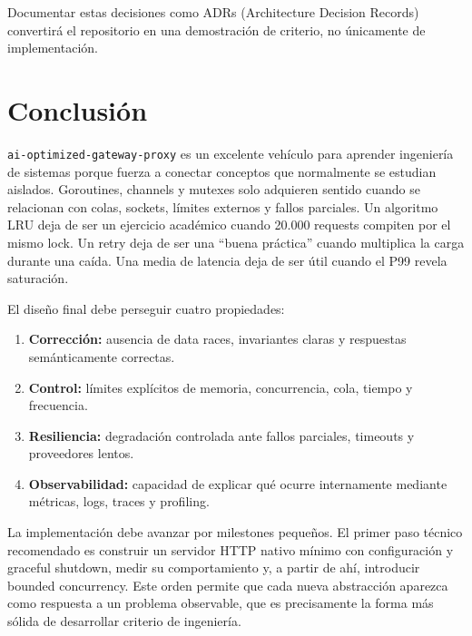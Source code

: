 \documentclass[11pt,a4paper]{article}
\newcommand{\project}{\texttt{ai-optimized-gateway-proxy}}
\begin{document}
Documentar estas decisiones como ADRs (Architecture Decision Records) convertirá el repositorio en una demostración de criterio, no únicamente de implementación.

\section{Conclusión}

\project{} es un excelente vehículo para aprender ingeniería de sistemas porque fuerza a conectar conceptos que normalmente se estudian aislados. Goroutines, channels y mutexes solo adquieren sentido cuando se relacionan con colas, sockets, límites externos y fallos parciales. Un algoritmo LRU deja de ser un ejercicio académico cuando 20.000 requests compiten por el mismo lock. Un retry deja de ser una ``buena práctica'' cuando multiplica la carga durante una caída. Una media de latencia deja de ser útil cuando el P99 revela saturación.

El diseño final debe perseguir cuatro propiedades:

\begin{enumerate}
  \item \textbf{Corrección:} ausencia de data races, invariantes claras y respuestas semánticamente correctas.
  \item \textbf{Control:} límites explícitos de memoria, concurrencia, cola, tiempo y frecuencia.
  \item \textbf{Resiliencia:} degradación controlada ante fallos parciales, timeouts y proveedores lentos.
  \item \textbf{Observabilidad:} capacidad de explicar qué ocurre internamente mediante métricas, logs, traces y profiling.
\end{enumerate}

La implementación debe avanzar por milestones pequeños. El primer paso técnico recomendado es construir un servidor HTTP nativo mínimo con configuración y graceful shutdown, medir su comportamiento y, a partir de ahí, introducir bounded concurrency. Este orden permite que cada nueva abstracción aparezca como respuesta a un problema observable, que es precisamente la forma más sólida de desarrollar criterio de ingeniería.
\end{document}
